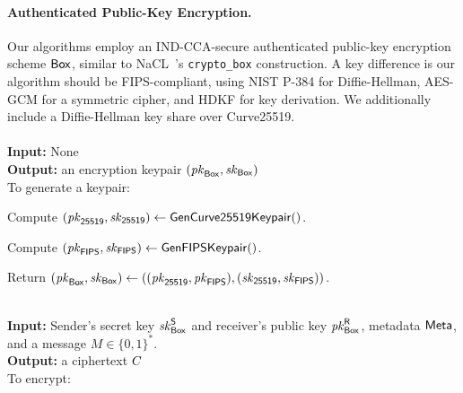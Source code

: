 \paragraph{Authenticated Public-Key Encryption.} Our algorithms employ an IND-CCA-secure authenticated public-key encryption scheme ${\sf Box}$, similar to NaCL~\cite{nacl}'s \texttt{crypto\_box} construction. A key difference is our algorithm should be FIPS-compliant, using NIST P-384 for Diffie-Hellman, AES-GCM for a symmetric cipher, and HDKF for key derivation. We additionally include a Diffie-Hellman key share over Curve25519.\\


{\underline {\bf \cboxkeygen}}\\
{\bf Input:} None \\
{\bf Output:} an encryption keypair $(\mathit{pk}_{{\sf Box}}, \mathit{sk}_{{\sf Box}})$ \\

\vspace{-1.5em}
To generate a keypair:

\vspace{-1.5em}
\begingroup
\RaggedRight
\begin{enumerate*}
\item Compute $(\mathit{pk}_{\sf 25519}, \mathit{sk}_{\sf 25519}) \leftarrow {\sf GenCurve25519Keypair}()$.
\item Compute $(\mathit{pk}_{\sf FIPS}, \mathit{sk}_{\sf FIPS}) \leftarrow {\sf GenFIPSKeypair}()$.
\item Return $(\mathit{pk}_{{\sf Box}}, \mathit{sk}_{{\sf Box}}) \leftarrow \left( (\mathit{pk}_{\sf 25519}, \mathit{pk}_{\sf FIPS}), (\mathit{sk}_{\sf 25519}, \mathit{sk}_{\sf FIPS}) \right)$.
\end{enumerate*}
\endgroup


{\underline {\bf \cboxencrypt}} \\
{\bf Input:} Sender's secret key $\mathit{sk}_{{\sf Box}}^{\sf S}$ and receiver's public key $\mathit{pk}_{{\sf Box}}^{\sf R}$, metadata ${\sf Meta}$, and a message $M \in \{0,1\}^{*}$. \\
{\bf Output:} a ciphertext $C$ \\

\vspace{-1.5em}
To encrypt:

